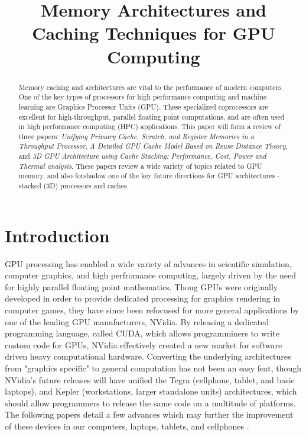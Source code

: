 \documentclass[conference]{IEEEtran}
\begin{document}
%
\title{Memory Architectures and Caching Techniques for GPU Computing}

\author{
}
\maketitle
\begin{abstract}
Memory caching and architectures are vital to the 
performance of modern computers. One of the key types of processors for high
performance computing and machine learning are Graphics Processor Units (GPU).
These specialized coprocessors are excellent for high-throughput, parallel
floating point computations, and are often used in high performance computing
(HPC) applications. This paper will form a review of three papers: 
\emph{Unifying Primary Cache, Scratch, and Register Memories in a Throughput
Processor}, \emph{A Detailed GPU Cache Model Based on Reuse Distance Theory}, 
and \emph{3D GPU Architecture using Cache Stacking: Performance, Cost, Power
and Thermal analysis}. These papers review a wide variety of topics related to
GPU memory, and also forshadow one of the key future directions for GPU
architectures - stacked (3D) processors and caches. 
\end{abstract}
\IEEEpeerreviewmaketitle

\section{Introduction}
GPU processing has enabled a wide variety of advances in scientific simulation,
computer graphics, and high perfromance computing, largely driven by the need
for highly parallel floating point mathematics. Thoug GPUs were originally
developed in order to provide dedicated processing for graphics rendering in
computer games, they have since been refocused for more general applications by
one of the leading GPU manufacturers, NVidia. By releasing a dedicated
programming language, called CUDA, which allows programminers to write custom
code for GPUs, NVidia effectively created a new market for software driven 
heavy computational hardware. Converting the underlying architectures from 
"graphics specific" to general computation has not been an easy feat, though 
NVidia's future releases will have unified the Tegra (cellphone, tablet,
and basic laptops), and Kepler (workstations, larger standalone units) 
architectures, which should allow programmers to release the same
code on a multitude of platforms. The following papers detail a few advances
which may further the improvement of these devices in our computers, laptops, 
tablets, and cellphones \cite{gtc}.
\end{document}
